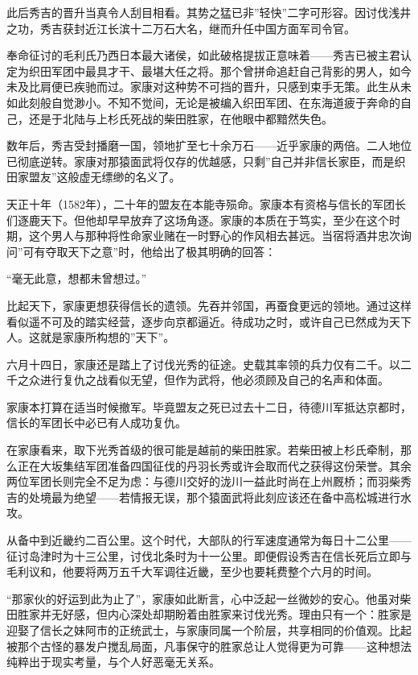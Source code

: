 \documentclass[
]{article}
\begin{document}
此后秀吉的晋升当真令人刮目相看。其势之猛已非''轻快''二字可形容。因讨伐浅井之功，秀吉获封近江长滨十二万石大名，继而升任中国方面军司令官。

奉命征讨的毛利氏乃西日本最大诸侯，如此破格提拔正意味着------秀吉已被主君认定为织田军团中最具才干、最堪大任之将。那个曾拼命追赶自己背影的男人，如今未及比肩便已疾驰而过。家康对这种势不可挡的晋升，只感到束手无策。此生从未如此刻般自觉渺小。不知不觉间，无论是被编入织田军团、在东海道疲于奔命的自己，还是于北陆与上杉氏死战的柴田胜家，在他眼中都黯然失色。

数年后，秀吉受封播磨一国，领地扩至七十余万石------近乎家康的两倍。二人地位已彻底逆转。家康对那猿面武将仅存的优越感，只剩''自己并非信长家臣，而是织田家盟友''这般虚无缥缈的名义了。

天正十年（1582年），二十年的盟友在本能寺殒命。家康本有资格与信长的军团长们逐鹿天下。但他却早早放弃了这场角逐。家康的本质在于笃实，至少在这个时期，这个男人与那种将性命家业赌在一时野心的作风相去甚远。当宿将酒井忠次询问''可有夺取天下之意''时，他给出了极其明确的回答：

``毫无此意，想都未曾想过。''

比起天下，家康更想获得信长的遗领。先吞并邻国，再蚕食更远的领地。通过这样看似遥不可及的踏实经营，逐步向京都逼近。待成功之时，或许自己已然成为天下人。这就是家康所构想的''天下''。

六月十四日，家康还是踏上了讨伐光秀的征途。史载其率领的兵力仅有二千。以二千之众进行复仇之战看似无望，但作为武将，他必须顾及自己的名声和体面。

家康本打算在适当时候撤军。毕竟盟友之死已过去十二日，待德川军抵达京都时，信长的军团长中必已有人成功复仇。

在家康看来，取下光秀首级的很可能是越前的柴田胜家。若柴田被上杉氏牵制，那么正在大坂集结军团准备四国征伐的丹羽长秀或许会取而代之获得这份荣誉。其余两位军团长则完全不足为虑：与德川交好的泷川一益此时尚在上州厩桥；而羽柴秀吉的处境最为绝望------若情报无误，那个猿面武将此刻应该还在备中高松城进行水攻。

从备中到近畿约二百公里。这个时代，大部队的行军速度通常为每日十二公里------征讨岛津时为十三公里，讨伐北条时为十一公里。即便假设秀吉在信长死后立即与毛利议和，他要将两万五千大军调往近畿，至少也要耗费整个六月的时间。

``那家伙的好运到此为止了''，家康如此断言，心中泛起一丝微妙的安心。他虽对柴田胜家并无好感，但内心深处却期盼着由胜家来讨伐光秀。理由只有一个：胜家是迎娶了信长之妹阿市的正统武士，与家康同属一个阶层，共享相同的价值观。比起被那个古怪的暴发户搅乱局面，凡事保守的胜家总让人觉得更为可靠------这种想法纯粹出于现实考量，与个人好恶毫无关系。
\end{document}
